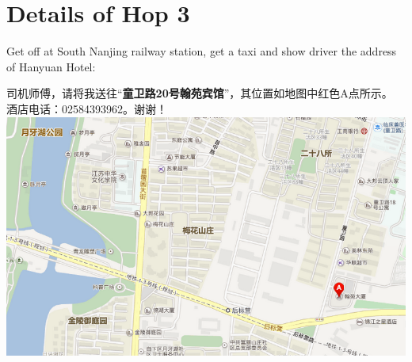 \documentclass[11pt]{article}
\begin{document}
\clearpage

\section{Details of Hop 3}
Get off at South Nanjing railway station, get a taxi and show driver the address of Hanyuan Hotel:

\begin{center}
	 司机师傅，请将我送往``{\bf 童卫路20号翰苑宾馆}''，其位置如地图中红色A点所示。\\
	 酒店电话：02584393962。谢谢！\\ \vspace{5mm}
     \includegraphics[scale=0.5]{badu.png}
\end{center}
\end{document}
